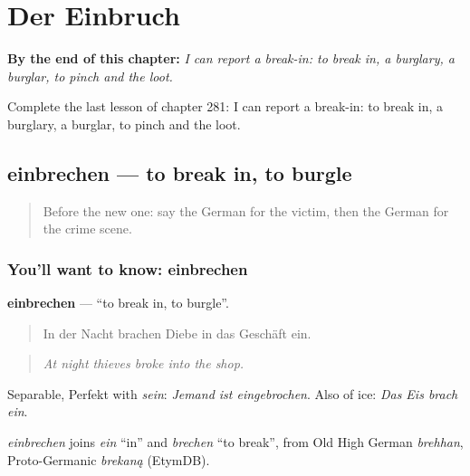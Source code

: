 
\chapter{Der Einbruch}
\label{ch:ge-der-einbruch}

\begin{chapteropening}
\textbf{By the end of this chapter:} \emph{I can report a break-in: to break in, a burglary, a burglar, to pinch and the loot.}

Complete the last lesson of chapter 281: I can report a break-in: to break in, a burglary, a burglar, to pinch and the loot.
\end{chapteropening}

\section[einbrechen]{einbrechen — to break in, to burgle}

\label{lesson:GE-C281-einbrechen}



\begin{quote}
Before the new one: say the German for the victim, then the German for the crime scene.
\end{quote}

\subsection*{You'll want to know: einbrechen}
\textbf{einbrechen} — \textquotedblleft{}to break in, to burgle\textquotedblright{}.

\begin{quote}
In der Nacht brachen Diebe in das Geschäft ein.
\end{quote}

\begin{quote}
\emph{At night thieves broke into the shop.}
\end{quote}

Separable, Perfekt with \emph{sein}: \emph{Jemand ist eingebrochen}. Also of ice: \emph{Das Eis brach ein}.

\begin{cousinweb}
\emph{einbrechen} joins \emph{ein} \textquotedblleft{}in\textquotedblright{} and \emph{brechen} \textquotedblleft{}to break\textquotedblright{}, from Old High German \emph{brehhan}, Proto-Germanic \emph{brekaną} (EtymDB).
\end{cousinweb}

